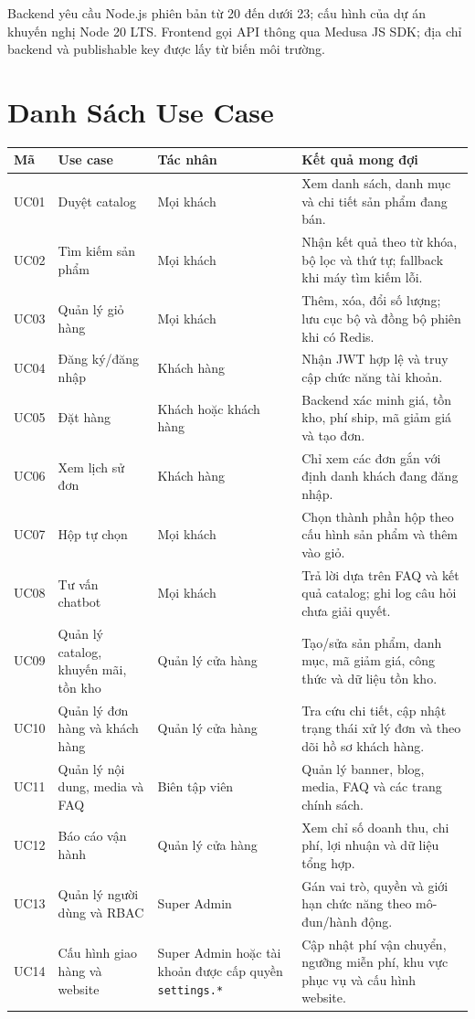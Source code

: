 Backend yêu cầu Node.js phiên bản từ 20 đến dưới 23; cấu hình của dự án khuyến nghị Node 20 LTS. Frontend gọi API thông qua Medusa JS SDK; địa chỉ backend và publishable key được lấy từ biến môi trường.

\section{Danh Sách Use Case}

\begin{longtable}{@{}L{0.10\textwidth} L{0.25\textwidth} L{0.20\textwidth} L{0.37\textwidth}@{}}
  \toprule
  \textbf{Mã} & \textbf{Use case} & \textbf{Tác nhân} & \textbf{Kết quả mong đợi} \\
  \midrule
  \endhead
  UC01 & Duyệt catalog & Mọi khách & Xem danh sách, danh mục và chi tiết sản phẩm đang bán. \\
  UC02 & Tìm kiếm sản phẩm & Mọi khách & Nhận kết quả theo từ khóa, bộ lọc và thứ tự; fallback khi máy tìm kiếm lỗi. \\
  UC03 & Quản lý giỏ hàng & Mọi khách & Thêm, xóa, đổi số lượng; lưu cục bộ và đồng bộ phiên khi có Redis. \\
  UC04 & Đăng ký/đăng nhập & Khách hàng & Nhận JWT hợp lệ và truy cập chức năng tài khoản. \\
  UC05 & Đặt hàng & Khách hoặc khách hàng & Backend xác minh giá, tồn kho, phí ship, mã giảm giá và tạo đơn. \\
  UC06 & Xem lịch sử đơn & Khách hàng & Chỉ xem các đơn gắn với định danh khách đang đăng nhập. \\
  UC07 & Hộp tự chọn & Mọi khách & Chọn thành phần hộp theo cấu hình sản phẩm và thêm vào giỏ. \\
  UC08 & Tư vấn chatbot & Mọi khách & Trả lời dựa trên FAQ và kết quả catalog; ghi log câu hỏi chưa giải quyết. \\
  UC09 & Quản lý catalog, khuyến mãi, tồn kho & Quản lý cửa hàng & Tạo/sửa sản phẩm, danh mục, mã giảm giá, công thức và dữ liệu tồn kho. \\
  UC10 & Quản lý đơn hàng và khách hàng & Quản lý cửa hàng & Tra cứu chi tiết, cập nhật trạng thái xử lý đơn và theo dõi hồ sơ khách hàng. \\
  UC11 & Quản lý nội dung, media và FAQ & Biên tập viên & Quản lý banner, blog, media, FAQ và các trang chính sách. \\
  UC12 & Báo cáo vận hành & Quản lý cửa hàng & Xem chỉ số doanh thu, chi phí, lợi nhuận và dữ liệu tổng hợp. \\
  UC13 & Quản lý người dùng và RBAC & Super Admin & Gán vai trò, quyền và giới hạn chức năng theo mô-đun/hành động. \\
  UC14 & Cấu hình giao hàng và website & Super Admin hoặc tài khoản được cấp quyền \texttt{settings.*} & Cập nhật phí vận chuyển, ngưỡng miễn phí, khu vực phục vụ và cấu hình website. \\
  \bottomrule
\end{longtable}

